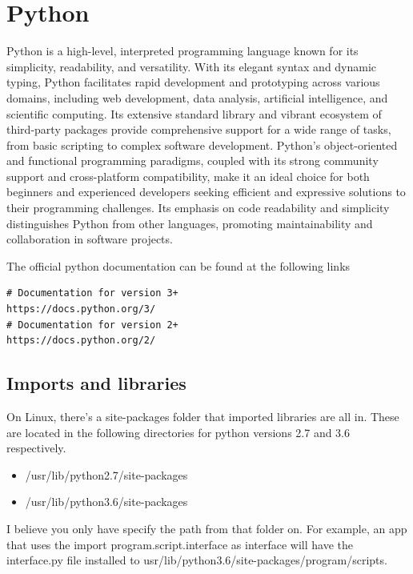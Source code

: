 \chapter{Python}
\thispagestyle{fancy}
\lstset{language=Python, style=pythonstyle}

Python is a high-level, interpreted programming language known for its simplicity, readability, and versatility. With its elegant syntax and dynamic typing, Python facilitates rapid development and prototyping across various domains, including web development, data analysis, artificial intelligence, and scientific computing. Its extensive standard library and vibrant ecosystem of third-party packages provide comprehensive support for a wide range of tasks, from basic scripting to complex software development. Python's object-oriented and functional programming paradigms, coupled with its strong community support and cross-platform compatibility, make it an ideal choice for both beginners and experienced developers seeking efficient and expressive solutions to their programming challenges. Its emphasis on code readability and simplicity distinguishes Python from other languages, promoting maintainability and collaboration in software projects.

\myindent The official python documentation can be found at the following links
\begin{lstlisting}
# Documentation for version 3+
https://docs.python.org/3/
# Documentation for version 2+
https://docs.python.org/2/
\end{lstlisting}







\section{Imports and libraries}

On Linux, there's a site-packages folder that imported libraries are all in. These are located in the following directories for python versions 2.7 and 3.6 respectively.

\begin{itemize}
	\item /usr/lib/python2.7/site-packages
	\item /usr/lib/python3.6/site-packages
\end{itemize}

I believe you only have specify the path from that folder on. For example, an app that uses the import program.script.interface as interface will have the interface.py file installed to usr/lib/python3.6/site-packages/program/scripts.


